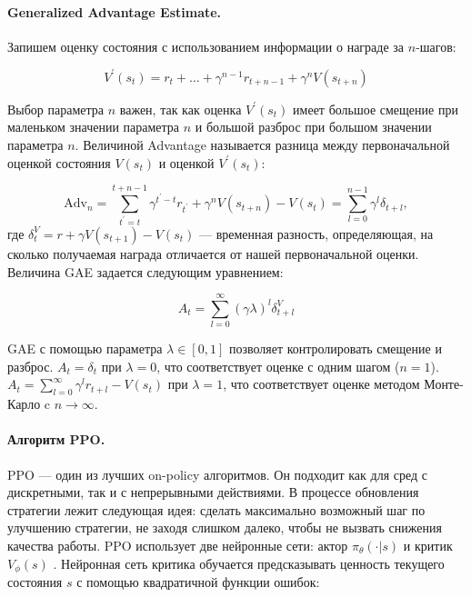\paragraph{Generalized Advantage Estimate.}
Запишем оценку состояния с использованием информации о награде за $n$-шагов:

\begin{equation}
    V^{\prime}(s_t) = r_t + \ldots + \gamma^{n-1} r_{t+n-1} + \gamma^{n}V(s_{t+n})
\end{equation}

Выбор параметра $n$ важен, так как оценка $V^{\prime}(s_t)$ имеет большое смещение при маленьком значении параметра $n$ и большой разброс при большом значении параметра $n$. Величиной Advantage называется разница между первоначальной оценкой состояния $V(s_t)$ и оценкой $V^{\prime}(s_t)$:

\begin{equation}
    \mathrm{Adv}_n = \sum_{t^{\prime} = t}^{t+n-1} \gamma^{t^{\prime} - t}r_{t^{\prime}} + \gamma^{n}V(s_{t+n}) - V(s_t) = \sum_{l = 0}^{n-1}\gamma^l\delta_{t+l},
\end{equation}
где $\delta_t^V = r + \gamma V(s_{t+1}) - V(s_t)$ --- временная разность, определяющая, на сколько получаемая награда отличается от нашей первоначальной оценки. Величина GAE задается следующим уравнением: 

\begin{equation}
    A_t = \sum_{l = 0}^{\infty}(\gamma \lambda)^l \delta_{t+l}^V
\end{equation}

GAE с помощью параметра $\lambda \in [0, 1]$ позволяет контролировать смещение и разброс. $A_t = \delta_t$ при $\lambda = 0$, что соответствует оценке с одним шагом ($n = 1$). $A_t = \sum_{l=0}^{\infty} \gamma^lr_{t+l} - V(s_t)$ при $\lambda = 1$, что соответствует оценке методом Монте-Карло c $n \to \infty$. 

\paragraph{Алгоритм PPO.}

PPO --- один из лучших on-policy алгоритмов. Он подходит как для сред с дискретными, так и с непрерывными действиями. В процессе обновления стратегии лежит следующая идея: сделать максимально возможный шаг по улучшению стратегии, не заходя слишком далеко, чтобы не вызвать снижения качества работы. PPO использует две нейронные сети: актор $\pi_{\theta}(\cdot|s)$ и критик $V_{\phi}(s)$ \cite{Schulman2017ProximalPO}. Нейронная сеть критика обучается предсказывать ценность текущего состояния $s$ с помощью квадратичной функции ошибок: 

